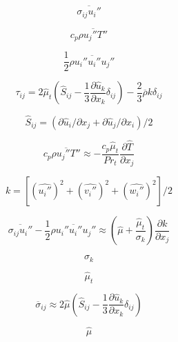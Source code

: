 \begin{equation}
\overline{\sigma_{ij} u_i''}
\end{equation}

\begin{equation}
c_p \overline {\rho u_j'' T''}
\end{equation}

\begin{equation}
\frac{1}{2} \overline{\rho u_i'' u_i'' u_j''}
\end{equation}

\begin{equation}
\tau_{ij}=2 \hat \mu_t \left( \hat S_{ij} - \frac{1}{3}
\frac{\partial \hat u_k}{\partial x_k} \delta_{ij} \right) - \frac{2}{3} \overline \rho k \delta_{ij}
\end{equation}

\begin{equation}
\hat S_{ij} = (\partial \hat u_i / \partial x_j +
\partial \hat u_j / \partial x_i) / 2
\end{equation}

\begin{equation}
c_p \overline {\rho u_j'' T''} \approx
-\frac{c_p \hat \mu_t}{Pr_t} \frac{\partial \hat T}{\partial x_j}
\end{equation}

\begin{equation}
k = [(\hat {u_i''})^2 + (\hat {v_i''})^2 + (\hat {w_i''})^2]/2
\end{equation}

\begin{equation}
\overline{\sigma_{ij} u_i''} - \frac{1}{2} \overline{\rho u_i'' u_i'' u_j''} \approx
\left( \hat \mu + \frac{\hat \mu_t}{\sigma_k} \right) \frac{\partial k}{\partial x_j}
\end{equation}

\begin{equation}
\sigma_k
\end{equation}

\begin{equation}
\hat \mu_t
\end{equation}

\begin{equation}
\overline\sigma_{ij} \approx 2 \hat \mu \left( \hat S_{ij} - \frac{1}{3} \frac{\partial \hat u_k}{\partial x_k}\delta_{ij} \right)
\end{equation}

\begin{equation}
\hat \mu
\end{equation}

